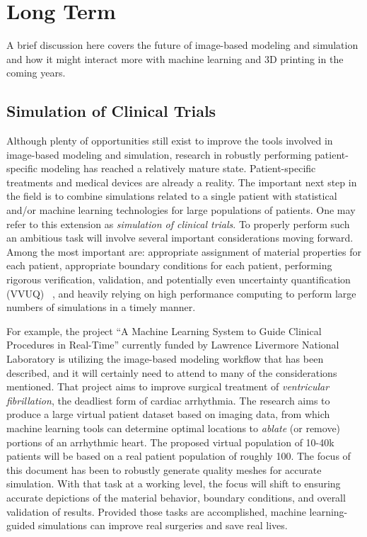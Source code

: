 \section{Long Term}
\label{Long Term}

A brief discussion here covers the future of image-based modeling and simulation and how it might interact more with machine learning and 3D printing in the coming years.

\subsection{Simulation of Clinical Trials}
\label{Simulation of Clinical Trials}

Although plenty of opportunities still exist to improve the tools involved in image-based modeling and simulation, research in robustly performing patient-specific modeling has reached a relatively mature state. Patient-specific treatments and medical devices are already a reality. The important next step in the field is to combine simulations related to a single patient with statistical and/or machine learning technologies for large populations of patients. One may refer to this extension as \textit{simulation of clinical trials}. To properly perform such an ambitious task will involve several important considerations moving forward. Among the most important are: appropriate assignment of material properties for each patient, appropriate boundary conditions for each patient, performing rigorous verification, validation, and potentially even uncertainty quantification (VVUQ) ~\cite{NAP13395}, and heavily relying on high performance computing to perform large numbers of simulations in a timely manner.

For example, the project ``A Machine Learning System to Guide Clinical Procedures in Real-Time'' currently funded by Lawrence Livermore National Laboratory is utilizing the image-based modeling workflow that has been described, and it will certainly need to attend to many of the considerations mentioned. That project aims to improve surgical treatment of \textit{ventricular fibrillation}, the deadliest form of cardiac arrhythmia. The research aims to produce a large virtual patient dataset based on imaging data, from which machine learning tools can determine optimal locations to \textit{ablate} (or remove) portions of an arrhythmic heart. The proposed virtual population of 10-40k patients will be based on a real patient population of roughly 100. The focus of this document has been to robustly generate quality meshes for accurate simulation. With that task at a working level, the focus will shift to ensuring accurate depictions of the material behavior, boundary conditions, and overall validation of results. Provided those tasks are accomplished, machine learning-guided simulations can improve real surgeries and save real lives.

